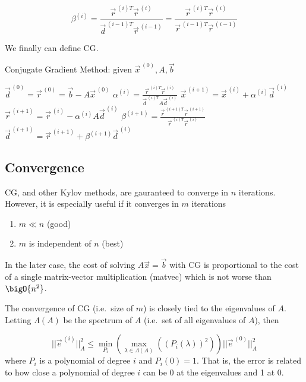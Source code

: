 \begin{equation*}
    \beta^{(i)} =
    \frac{\vec{r}^{\,(i)T}\vec{r}^{\,(i)}}
        {\vec{d}^{\,(i-1)T}\vec{r}^{\,(i-1)}}
        =
    \frac{\vec{r}^{\,(i)T}\vec{r}^{\,(i)}}
        {\vec{r}^{\,(i-1)T}\vec{r}^{\,(i-1)}}
\end{equation*}

We finally can define CG.

\begin{algorithm}
    \caption{Conjugate Gradient Method: given $\vec{x}^{\,(0)}, A, \vec{b}$}
\begin{algorithmic}
    \STATE $\vec{d}^{\,(0)} = \vec{r}^{\,(0)} =\vec{b}- A \vec{x}^{\,(0)}  $
        \STATE $\alpha^{(i)}=\frac{\vec{r}^{\,(i)T}\vec{r}^{\,(i)}}
        {\vec{d}^{\,(i)T}A\vec{d}^{\,(i)}}$
        \STATE $\vec{x}^{\,(i+1)} = \vec{x}^{\,(i)} + \alpha^{(i)}\vec{d}^{\,(i)}$
        \STATE $\vec{r}^{\,(i+1)} = \vec{r}^{\,(i)} - \alpha^{(i)}A\vec{d}^{\,(i)}$
        \STATE $\beta^{(i+1)} = \frac{\vec{r}^{\,(i+1)T}\vec{r}^{\,(i+1)}} {\vec{r}^{\,(i)T}\vec{r}^{\,(i)}}$
        \STATE $\vec{d}^{\,(i+1)} = \vec{r}^{\,(i+1)} + \beta^{(i+1)}\vec{d}^{\,(i)}$
    \ENDFOR
\end{algorithmic}
\end{algorithm}


\subsection{Convergence}
CG, and other Kylov methods, are gauranteed to converge in $n$ iterations. However, it is especially useful if it converges in $m$ iterations

\begin{enumerate}[1)]
    \item $m\ll n$ \qquad (good)
    \item $m$ is independent of $n$ (best)
\end{enumerate}

In the later case, the cost of solving $A\vec{x} = \vec{b}$ with CG is proportional to the cost of a single matrix-vector multiplication (matvec) which is not worse than $\bigO{n^2}$.

The convergence of CG (i.e.\ size of $m$) is closely tied to the eigenvalues of $A$. Letting $\Lambda(A)$ be the spectrum of $A$ (i.e.\ set of all eigenvalues of $A$), then

\begin{equation*}
    \lvert\lvert \vec{e}^{\,(i)} \rvert\rvert^{2}_{A} \leq
    \min_{P_i} \left(
    \max_{\lambda \in \Lambda(A)}
    \left(
    (P_i(\lambda))^2
    \right)
    \right)
    \lvert\lvert \vec{e}^{\,(0)} \rvert\rvert^{2}_{A}
\end{equation*}
where $P_i$ is a polynomial of degree $i$ and $P_i(0)=1$. That is, the error is related to how close a polynomial of degree $i$ can be 0 at the eigenvalues and 1 at 0.

